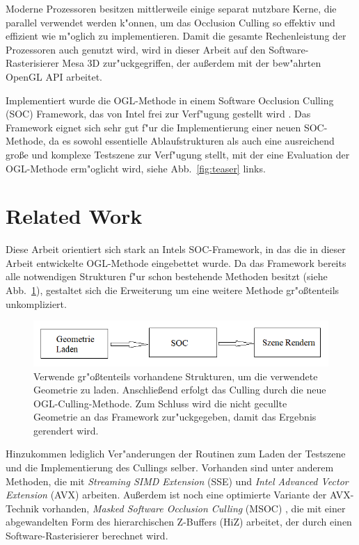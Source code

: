 \documentclass[journal]{vgtc}
\begin{document}
Moderne Prozessoren besitzen mittlerweile einige separat nutzbare Kerne, die parallel verwendet werden k"onnen, um das Occlusion Culling so effektiv und effizient wie m"oglich zu implementieren. Damit die gesamte Rechenleistung der Prozessoren auch genutzt wird, wird in dieser Arbeit auf den Software-Rasterisierer Mesa 3D zur"uckgegriffen, der au{\ss}erdem mit der bew"ahrten OpenGL API arbeitet. 

Implementiert wurde die OGL-Methode in einem Software Occlusion Culling (SOC) Framework, das von Intel frei zur Verf"ugung gestellt wird \cite{SOCF}. Das Framework eignet sich sehr gut f"ur die Implementierung einer neuen SOC-Methode, da es sowohl essentielle Ablaufstrukturen als auch eine ausreichend gro{\ss}e und komplexe Testszene zur Verf"ugung stellt, mit der eine Evaluation der OGL-Methode erm"oglicht wird, siehe Abb.\ \ref{fig:teaser} links.


\section{Related Work}
Diese Arbeit orientiert sich stark an Intels SOC-Framework, in das die in dieser Arbeit entwickelte OGL-Methode eingebettet wurde. Da das Framework bereits alle notwendigen Strukturen f"ur schon bestehende Methoden besitzt (siehe Abb.\ \ref{fig:ablaufframework}), gestaltet sich die Erweiterung um eine weitere Methode gr"o{\ss}tenteils unkompliziert. 
\begin{figure}%
\includegraphics[width=\columnwidth]{images/AblaufFramework.png}%
\caption{Verwende gr"o{\ss}tenteils vorhandene Strukturen, um die verwendete Geometrie zu laden. Anschlie{\ss}end erfolgt das Culling durch die neue OGL-Culling-Methode. Zum Schluss wird die nicht gecullte Geometrie an das Framework zur"uckgegeben, damit das Ergebnis gerendert wird.}%
\label{fig:ablaufframework}%
\end{figure}
Hinzukommen lediglich Ver"anderungen der Routinen zum Laden der Testszene und die Implementierung des Cullings selber. Vorhanden sind unter anderem Methoden, die mit \textit{Streaming SIMD Extension} (SSE) und \textit{Intel Advanced Vector Extension} (AVX) arbeiten. Au{\ss}erdem ist noch eine optimierte Variante der AVX-Technik vorhanden, \textit{Masked Software Occlusion Culling} (MSOC) \cite{MSOC}, die mit einer abgewandelten Form des hierarchischen Z-Buffers (HiZ) \cite{HiZ} arbeitet, der durch einen Software-Rasterisierer berechnet wird.
\end{document}
